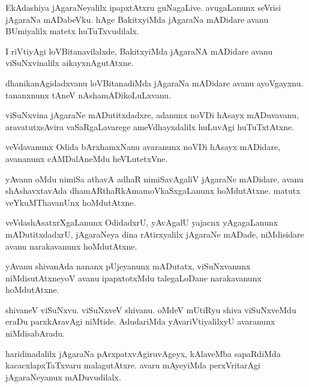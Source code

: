 \documentclass{article}
\begin{document}
\begin{mn}%
EkAdashiya jAgaraNeyalilx ipapxtAtxru guNagaLive. avugaLanunx seVrisi jAgaraNa mADabeVku. hAge 
BakitxyiMda jAgaraNa mADidare avanu BUmiyalilx matetx huTuTxvudilalx.
\end{mn}

\begin{mn}%
I riVtiyAgi loVBitanavilalxde, BakitxyiMda jAgaraNA mADidare avanu viSuNxvinalilx aikayxnAgutAtxne.
\end{mn}

\begin{mn}%
dhanikanAgidadxvanu loVBitanadiMda jAgaraNa mADidare avanu ayoVgayxnu. tananxnunx tAneV 
nAshamADikoLuLxvanu.
\end{mn}

\begin{mn}%
viSuNxvina jAgaraNe mADutitxdadxre, adanunx noVDi hAsayx mADuvavanu, aravatutxsAvira 
vaSaRgaLavarege ameVdhayxdalilx huLuvAgi huTuTxtAtxne.
\end{mn}

\begin{mn}%
veVdavanunx Odida bArxhamxNanu avaranunx noVDi hAsayx mADidare, avananunx cAMDalAneMdu heVLutetxVne.
\end{mn}

\begin{mn}%
yAvanu oMdu nimiSa athavA adhaR nimiSavAgaliV jAgaraNe mADidare, avanu shAshavxtavAda 
dhamARthaRkAmamoVkaSxgaLanunx hoMdutAtxne. matutx veYkuMThavanUnx hoMdutAtxne.
\end{mn}

\begin{mn}%
veVdashAsatxrXgaLanunx OdidadxrU, yAvAgalU yajacnx yAgagaLanunx mADutitxdadxrU, jAgaraNeya dina 
rAtirxyalilx jAgaraNe mADade, niMdisidare avanu narakavanunx hoMdutAtxne.
\end{mn}

\begin{mn}%
yAvanu shivanAda nananx pUjeyanunx mADutatx, viSuNxvanunx niMdisutAtxneyoV avanu ipapxtotxMdu 
talegaLoDane narakavanunx hoMdutAtxne.
\end{mn}

\begin{mn}%
shivaneV viSuNxvu. viSuNxveV shivanu. oMdeV mUtiRyu shiva viSuNxveMdu eraDu parxkAravAgi niMtide. 
AdudariMda yAvariVtiyalilxyU avaranunx niMdisabAradu.
\end{mn}

\begin{mn}%
haridinadalilx jAgaraNa pArxpatxvAgiruvAgeyx, kAlaveMba sapaRdiMda kacacxlapxTaTxvaru malagutAtxre. 
avaru mAyeyiMda perxVritarAgi jAgaraNeyanux mADuvudilalx.
\end{mn}
\end{document}
